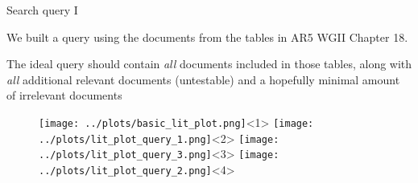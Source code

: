 \documentclass[9pt]{beamer}
\begin{document}
\begin{frame}{Search query I}

We built a query using the documents from the tables in AR5 WGII Chapter 18.

The ideal query should contain \textit{all} documents included in those tables, along with \textit{all} additional relevant documents (untestable) and a hopefully minimal amount of irrelevant documents

\begin{figure}
\texttt{[image: ../plots/basic\_lit\_plot.png]}<1>
\texttt{[image: ../plots/lit\_plot\_query\_1.png]}<2>
\texttt{[image: ../plots/lit\_plot\_query\_3.png]}<3>
\texttt{[image: ../plots/lit\_plot\_query\_2.png]}<4>
\end{figure}
\end{frame}
\end{document}

